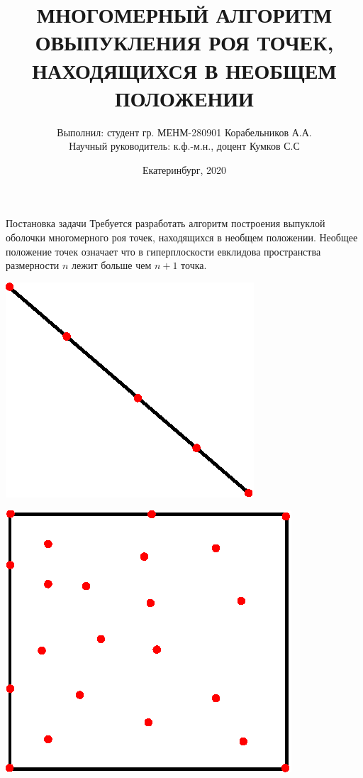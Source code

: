 \documentclass{beamer}
\begin{document}
\title{МНОГОМЕРНЫЙ АЛГОРИТМ ОВЫПУКЛЕНИЯ РОЯ ТОЧЕК, НАХОДЯЩИХСЯ В НЕОБЩЕМ ПОЛОЖЕНИИ}
\author[Корабельников А.А.]{\scriptsize Выполнил: студент гр. МЕНМ-280901 Корабельников А.А.\\Научный руководитель: к.ф.-м.н., доцент Кумков С.С}
\date{Екатеринбург, 2020}
\frame{\titlepage}
\begin{frame}{Постановка задачи}
   Требуется разработать алгоритм построения выпуклой оболочки многомерного роя точек, находящихся в необщем положении.
   \vfill
   Необщее положение точек означает что в гиперплоскости евклидова пространства размерности $n$ лежит больше чем $n+1$ точка.\\
   \vfill
    \begin{minipage}{.49\textwidth}
    \centering
    \includegraphics[width=0.5\linewidth]{line.eps}
  \end{minipage}
  \begin{minipage}{.49\textwidth}
    \centering
    \includegraphics[width=0.5\linewidth]{cube1.eps}
  \end{minipage}
\end{frame}
\end{document}
